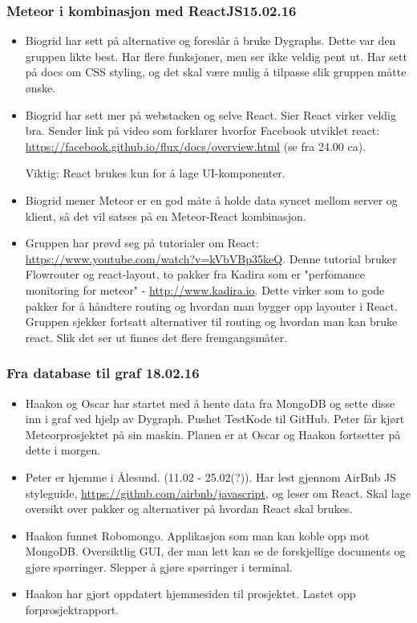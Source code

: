 \documentclass[12pt, oneside]{article}
\begin{document}
\subsubsection{Meteor i kombinasjon med ReactJS15.02.16}
\begin{itemize}
	\item Biogrid har sett på alternative og foreslår å bruke Dygraphs. Dette var den gruppen likte best. Har flere funksjoner, men ser ikke veldig pent 		ut. Har sett på 		docs om CSS styling, og det skal være mulig å tilpasse slik gruppen måtte ønske.
	\item Biogrid har sett mer på webstacken og selve React. Sier React virker veldig bra. Sender link på video som forklarer hvorfor Facebook 			utviklet react: 		\url{https://facebook.github.io/flux/docs/overview.html} (se fra 24.00 ca).
	
		Viktig: React brukes kun for å lage UI-komponenter.
	\item Biogrid mener Meteor er en god måte å holde data syncet mellom server og klient, så det vil satses på en Meteor-React kombinasjon. 
	\item Gruppen har prøvd seg på tutorialer om React:\\
		\url{https://www.youtube.com/watch?v=kVbVBp35keQ}. Denne tutorial bruker Flowrouter og react-layout, to pakker fra Kadira som er "perfomance monitoring for 			meteor" - \url{http://www.kadira.io}. Dette virker som to gode pakker for å håndtere routing og hvordan man bygger opp layouter i React. Gruppen sjekker fortsatt alternativer 		til routing og hvordan man kan bruke react. Slik det ser ut finnes det flere fremgangsmåter.
\end{itemize}



\subsubsection{Fra database til graf 18.02.16}
\begin{itemize}
	\item Haakon og Oscar har startet med å hente data fra MongoDB og sette disse inn i graf ved hjelp av Dygraph. Pushet TestKode til GitHub. Peter får kjørt 			Meteorprosjektet på sin maskin. Planen er at Oscar og Haakon fortsetter på dette i morgen.
	\item Peter er hjemme i Ålesund. (11.02 - 25.02(?)). Har lest gjennom AirBnb JS styleguide, \url{https://github.com/airbnb/javascript}, og leser om React. Skal lage oversikt over pakker og alternativer på hvordan 		React skal brukes.
	\item Haakon funnet Robomongo. Applikasjon som man kan koble opp mot MongoDB. Oversiktlig GUI, der man lett kan se de forskjellige documents og gjøre 				spørringer. Slepper å gjøre spørringer i terminal.
	\item Haakon har gjort oppdatert hjemmesiden til prosjektet. Lastet opp forprosjektrapport. 
\end{itemize}
\end{document}
